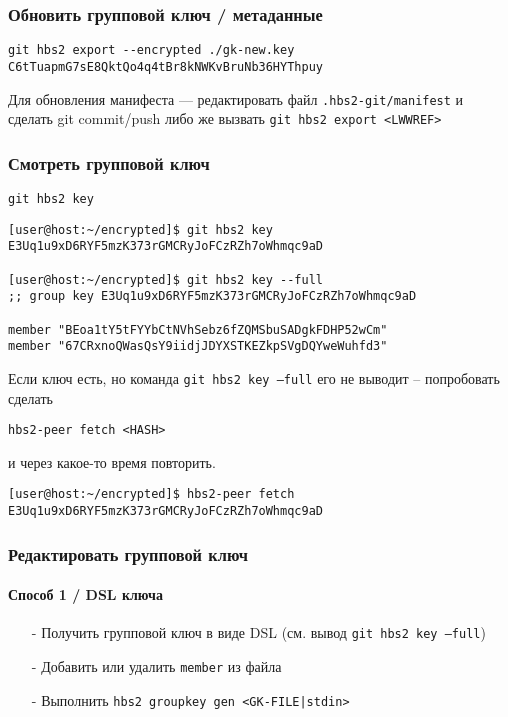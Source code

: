 \documentclass[11pt,a4paper]{article}
\begin{document}
\subsubsection{Обновить групповой ключ / метаданные}

\begin{verbatim}
git hbs2 export --encrypted ./gk-new.key  C6tTuapmG7sE8QktQo4q4tBr8kNWKvBruNb36HYThpuy
\end{verbatim}

Для обновления манифеста --- редактировать файл \texttt{.hbs2-git/manifest} и сделать
git commit/push либо же вызвать \texttt{git hbs2 export <LWWREF>}

\subsubsection{Смотреть групповой ключ}

\texttt{git hbs2 key}

\begin{verbatim}
[user@host:~/encrypted]$ git hbs2 key
E3Uq1u9xD6RYF5mzK373rGMCRyJoFCzRZh7oWhmqc9aD

[user@host:~/encrypted]$ git hbs2 key --full
;; group key E3Uq1u9xD6RYF5mzK373rGMCRyJoFCzRZh7oWhmqc9aD

member "BEoa1tY5tFYYbCtNVhSebz6fZQMSbuSADgkFDHP52wCm"
member "67CRxnoQWasQsY9iidjJDYXSTKEZkpSVgDQYweWuhfd3"

\end{verbatim}

Если ключ есть, но команда \texttt{git hbs2 key --full} его не выводит --
попробовать сделать

\texttt{hbs2-peer fetch <HASH>}

и через какое-то время повторить.

\begin{verbatim}
[user@host:~/encrypted]$ hbs2-peer fetch E3Uq1u9xD6RYF5mzK373rGMCRyJoFCzRZh7oWhmqc9aD
\end{verbatim}

\subsubsection{Редактировать групповой ключ}

\paragraph{Способ 1 / DSL ключа}

\begin{itemize}
  \item[-] Получить групповой ключ в виде DSL (см. вывод \texttt{git hbs2 key --full})
  \item[-] Добавить или удалить \texttt{member} из файла
  \item[-] Выполнить \texttt{hbs2 groupkey gen <GK-FILE|stdin>}
\end{itemize}
\end{document}
